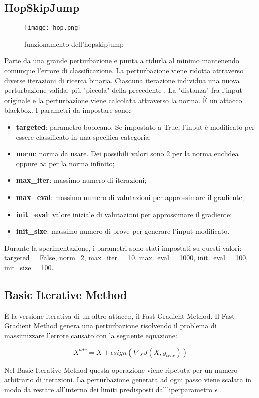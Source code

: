 \subsection{HopSkipJump}
\begin{figure}[h]
    \texttt{[image: hop.png]}
    \caption{funzionamento dell'hopskipjump\cite{hopskip}}
    \label{fig:hop}
\end{figure}
Parte da una grande perturbazione e punta a ridurla al minimo mantenendo comunque l'errore di classificazione.
La perturbazione viene ridotta attraverso diverse iterazioni di ricerca binaria. Ciascuna iterazione individua una nuova perturbazione valida, più "piccola" della precedente \cite{hopskip}.
La "distanza" fra l'input originale e la perturbazione viene calcolata attraverso la norma.
È un attacco blackbox. I parametri da impostare sono: \begin{itemize}
    \item \textbf{targeted}: parametro booleano. Se impostato a True, l'input è modificato  per essere classificato in una specifica categoria;
    \item \textbf{norm}: norma da usare. Dei possibili valori sono 2 per la norma euclidea oppure $\infty$ per la norma infinito;
    \item \textbf{max\_iter}: massimo numero di iterazioni;
    \item \textbf{max\_eval}: massimo numero di valutazioni per approssimare il gradiente;
    \item \textbf{init\_eval}: valore iniziale di valutazioni per approssimare il gradiente;
    \item \textbf{init\_size}: massimo numero di prove per generare l'input modificato.
\end{itemize}
Durante la sperimentazione, i parametri sono stati impostati su questi valori: targeted = False, norm=2, max\_iter = 10, max\_eval = 1000, init\_eval = 100, init\_size = 100.
\subsection{Basic Iterative Method}
È la versione iterativa di un altro attacco, il Fast Gradient Method. Il Fast Gradient Method genera una perturbazione risolvendo il problema di massimizzare l'errore causato con la seguente equazione:

\[X^{adv} = X + \epsilon sign(\nabla _{X}J(X,y_{true}))\]

Nel Basic Iterative Method  questa operazione viene ripetuta per un numero arbitrario di iterazioni.  La perturbazione generata ad ogni passo viene scalata in modo da restare
all'interno dei limiti predisposti dall'iperparametro $\epsilon$ \cite{bim}.

